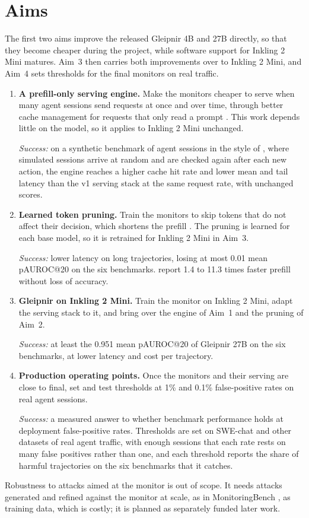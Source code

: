 \section{Aims}
\label{sec:aims}
The first two aims improve the released Gleipnir 4B and 27B directly, so that
they become cheaper during the project, while software support for Inkling 2
Mini matures. Aim~3 then carries both improvements over to Inkling 2 Mini, and Aim~4
sets thresholds for the final monitors on real traffic.

\begin{enumerate}
    \item \textbf{A prefill-only serving engine.} Make the monitors cheaper
    to serve when many agent sessions send requests at once and over time,
    through better cache management for requests that only read a prompt
    \citep{du2025prefillonly}. This work depends little on the model, so it
    applies to Inkling 2 Mini unchanged.

    \emph{Success:} on a synthetic benchmark of agent sessions in the style of
    \citet{du2025prefillonly}, where simulated sessions arrive at random and
    are checked again after each new action, the engine reaches a higher cache
    hit rate and lower mean and tail latency than the v1 serving stack at the
    same request rate, with unchanged scores.

    \item \textbf{Learned token pruning.} Train the monitors to skip tokens
    that do not affect their decision, which shortens the prefill
    \citep{patel2026tokengate}. The pruning is learned for each base model, so
    it is retrained for Inkling 2 Mini in Aim~3.

    \emph{Success:} lower latency on long trajectories, losing at most 0.01
    mean pAUROC@20 on the six benchmarks.  report
    1.4 to 11.3 times faster prefill without loss of accuracy.

    \item \textbf{Gleipnir on Inkling 2 Mini.} Train the monitor on Inkling 2
    Mini, adapt the serving stack to it, and bring over the engine of Aim~1
    and the pruning of Aim~2.

    \emph{Success:} at least the 0.951 mean pAUROC@20 of Gleipnir 27B on the
    six benchmarks, at lower latency and cost per trajectory.

    \item \textbf{Production operating points.} Once the monitors and their
    serving are close to final, set and test thresholds at 1\% and 0.1\%
    false-positive rates on real agent sessions.

    \emph{Success:} a measured answer to whether benchmark performance holds
    at deployment false-positive rates. Thresholds are set on SWE-chat
    \citep{baumann2026swechat} and other datasets of real agent traffic, with
    enough sessions that each rate rests on many false positives rather than
    one, and each threshold reports the share of harmful trajectories on the
    six benchmarks that it catches.
\end{enumerate}

Robustness to attacks aimed at the monitor is out of scope. It needs attacks
generated and refined against the monitor at scale, as in MonitoringBench
\citep{jotautaite2026monitoringbench}, as training data, which is costly; it is
planned as separately funded later work.
